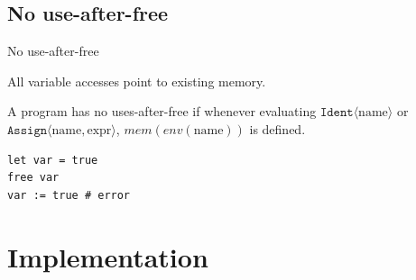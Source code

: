 \documentclass{EESD}
\begin{document}
\subsection{No use-after-free}
\begin{frame}[fragile]{No use-after-free}

    All variable accesses point to existing memory. 

    \begin{definition}
        A program has no uses-after-free if whenever evaluating $\texttt{Ident}\langle \text{name} \rangle$ or $\texttt{Assign}\langle \text{name}, \text{expr} \rangle$, $mem(env(\text{name}))$ is defined.
    \end{definition}

    \begin{lstlisting}
let var = true
free var
var := true # error
\end{lstlisting}
\end{frame}



\section{Implementation}

\end{document}
